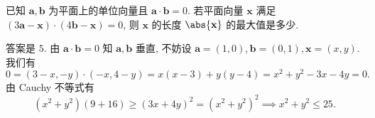 \begin{prob}
\label{prob:prob-4}
已知 $\mathbf{a}, \mathbf{b}$ 为平面上的单位向量且
$\mathbf{a}\cdot \mathbf{b} = 0$. 若平面向量 $\mathbf{x}$
满足 $(3\mathbf{a} - \mathbf{x})\cdot (4\mathbf{b} - \mathbf{x}) = 0$,
则 $\mathbf{x}$ 的长度 $\abs{\mathbf{x}}$ 的最大值是多少.
\end{prob}

\begin{soln}
答案是 $\boxed{5.}$ 由 $\mathbf{a}\cdot \mathbf{b} = 0$
知 $\mathbf{a}, \mathbf{b}$ 垂直, 不妨设 $\mathbf{a} = (1,0),
\mathbf{b} = (0,1), \mathbf{x} = (x,y)$. 我们有
\[
0 = (3-x, -y)\cdot (-x, 4-y) = x(x-3) + y(y-4) = x^2 + y^2 - 3x - 4y = 0.
\]
由 Cauchy 不等式有
\[
(x^2 + y^2)(9 + 16) \ge (3x + 4y)^2 = (x^2 + y^2)^2 \implies x^2 + y^2 \le 25.
\]
\end{soln}
